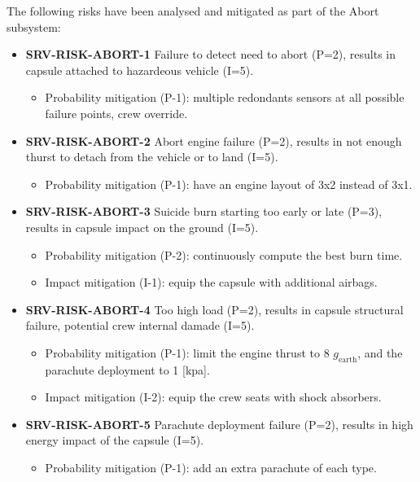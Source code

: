 \noindent The following risks have been analysed and mitigated as part of the Abort subsystem:

\begin{itemize}
	 \item \textbf{SRV-RISK-ABORT-1} Failure to detect need to abort (P=2), results in capsule attached to hazardeous vehicle (I=5).
	\begin{itemize}
		 \item Probability mitigation (P-1): multiple redondants sensors at all possible failure points, crew override.	\end{itemize}
	 \item \textbf{SRV-RISK-ABORT-2} Abort engine failure (P=2), results in not enough thurst to detach from the vehicle or to land (I=5).
	\begin{itemize}
		 \item Probability mitigation (P-1): have an engine layout of 3x2 instead of 3x1.	\end{itemize}
	 \item \textbf{SRV-RISK-ABORT-3} Suicide burn starting too early or late (P=3), results in capsule impact on the ground (I=5).
	\begin{itemize}
		 \item Probability mitigation (P-2): continuously compute the best burn time.		 \item Impact mitigation (I-1): equip the capsule with additional airbags.	\end{itemize}
	 \item \textbf{SRV-RISK-ABORT-4} Too high load (P=2), results in capsule structural failure, potential crew internal damade (I=5).
	\begin{itemize}
		 \item Probability mitigation (P-1): limit the engine thrust to 8 $g_\textrm{{earth}}$, and the parachute deployment to 1 [kpa].		 \item Impact mitigation (I-2): equip the crew seats with shock absorbers.	\end{itemize}
	 \item \textbf{SRV-RISK-ABORT-5} Parachute deployment failure (P=2), results in high energy impact of the capsule (I=5).
	\begin{itemize}
		 \item Probability mitigation (P-1): add an extra parachute of each type.	\end{itemize}
\end{itemize}

